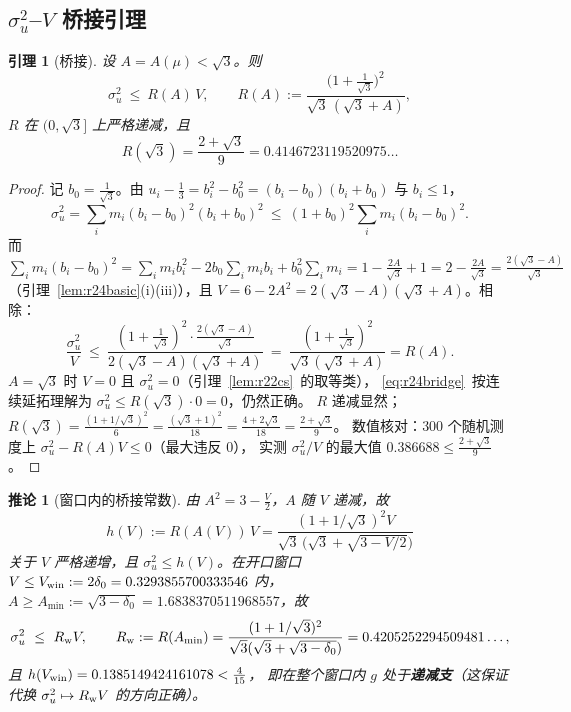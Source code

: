 \documentclass[UTF8,11pt]{ctexart}
\newtheorem{lemma}[theorem]{引理}
\newtheorem{corollary}[theorem]{推论}
\theoremstyle{definition}
\begin{document}
\subsection{$\sigma_u^2$--$V$ 桥接引理}\label{sec:r24:bridge}

\begin{lemma}[桥接]\label{lem:r24bridge}
设 $A=A(\mu)<\sqrt3$。则
\begin{equation}\label{eq:r24bridge}
\sigma_u^2\ \le\ R(A)\,V,\qquad
R(A):=\frac{\bigl(1+\frac1{\sqrt3}\bigr)^2}{\sqrt3\,(\sqrt3+A)} ,
\end{equation}
$R$ 在 $(0,\sqrt3]$ 上严格递减，且
\begin{equation}\label{eq:r24Rlim}
R(\sqrt3)=\frac{2+\sqrt3}9=0.4146723119520975\ldots
\end{equation}
\end{lemma}

\begin{proof}
记 $b_0=\frac1{\sqrt3}$。由 $u_i-\frac13=b_i^2-b_0^2=(b_i-b_0)(b_i+b_0)$ 与 $b_i\le1$，
\[
\sigma_u^2=\sum_im_i(b_i-b_0)^2(b_i+b_0)^2\ \le\ (1+b_0)^2\sum_im_i(b_i-b_0)^2 .
\]
而 $\sum_im_i(b_i-b_0)^2=\sum_im_ib_i^2-2b_0\sum_im_ib_i+b_0^2\sum_im_i
=1-\frac{2A}{\sqrt3}+1=2-\frac{2A}{\sqrt3}=\frac{2(\sqrt3-A)}{\sqrt3}$
（引理~\ref{lem:r24basic}(i)(iii)），且 $V=6-2A^2=2(\sqrt3-A)(\sqrt3+A)$。相除：
\[
\frac{\sigma_u^2}V\ \le\ \frac{(1+\frac1{\sqrt3})^2\cdot\frac{2(\sqrt3-A)}{\sqrt3}}{2(\sqrt3-A)(\sqrt3+A)}
\ =\ \frac{(1+\frac1{\sqrt3})^2}{\sqrt3(\sqrt3+A)}=R(A).
\]
$A=\sqrt3$ 时 $V=0$ 且 $\sigma_u^2=0$（引理~\ref{lem:r22cs}~的取等类），
\eqref{eq:r24bridge}~按连续延拓理解为 $\sigma_u^2\le R(\sqrt3)\cdot0=0$，仍然正确。
$R$ 递减显然；$R(\sqrt3)=\frac{(1+1/\sqrt3)^2}{6}=\frac{(\sqrt3+1)^2}{18}=\frac{4+2\sqrt3}{18}=\frac{2+\sqrt3}9$。
数值核对：$300$ 个随机测度上 $\sigma_u^2-R(A)V\le0$（最大违反 $0$），
实测 $\sigma_u^2/V$ 的最大值 $0.386688\le\frac{2+\sqrt3}9$。
\end{proof}

\begin{corollary}[窗口内的桥接常数]\label{cor:r24Rw}
由 $A^2=3-\frac V2$，$A$ 随 $V$ 递减，故
\[
h(V):=R(A(V))\,V=\frac{(1+1/\sqrt3)^2V}{\sqrt3\,\bigl(\sqrt3+\sqrt{3-V/2}\bigr)}
\]
关于 $V$ 严格递增，且 $\sigma_u^2\le h(V)$。在开口窗口 $V\le V_{\rm win}:=2\delta_0=0.3293855700333546$ 内，
$A\ge A_{\min}:=\sqrt{3-\delta_0}=1.6838370511968557$，故
\begin{equation}\label{eq:r24Rw}
\sigma_u^2\ \le\ R_{\rm w}V,\qquad
R_{\rm w}:=R(A_{\min})=\frac{(1+1/\sqrt3)^2}{\sqrt3(\sqrt3+\sqrt{3-\delta_0})}=0.4205252294509481\ldots ,
\end{equation}
且 $h(V_{\rm win})=0.1385149424161078<\frac4{15}$，
即在整个窗口内 $g$ 处于\textbf{递减支}（这保证代换 $\sigma_u^2\mapsto R_{\rm w}V$ 的方向正确）。
\end{corollary}
\end{document}
